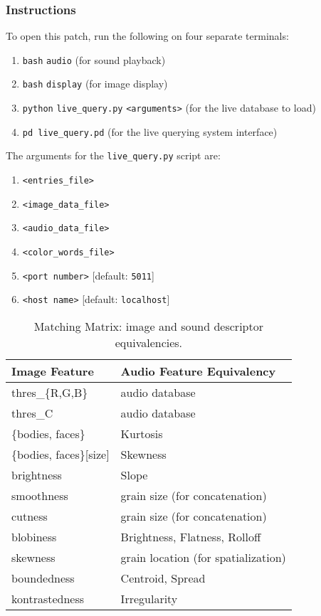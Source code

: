 \subsubsection{Instructions}

To open this patch, run the following on four separate terminals:

\begin{enumerate}
\footnotesize
\singlespacing
\item \texttt{bash} \texttt{audio} (for sound playback)
\item \texttt{bash} \texttt{display} (for image display)
\item \texttt{python} \texttt{live\_query.py} \texttt{<arguments>} (for the live database to load)
\item \texttt{pd live\_query.pd} (for the live querying system interface)
\end{enumerate}

The arguments for the \texttt{live\_query.py} script are:

\begin{enumerate}
  \footnotesize
\singlespacing
  \item \texttt{<entries\_file>} 
  \item \texttt{<image\_data\_file>} 
  \item \texttt{<audio\_data\_file>} 
  \item \texttt{<color\_words\_file>} 
  \item \texttt{<port number>} [default: \texttt{5011}]
  \item \texttt{<host name>} [default: \texttt{localhost}]
\end{enumerate}


\begin{table}
\begin{tabular}{l | l}
Image Feature & Audio Feature Equivalency \tabularnewline\hline

thres\_\{R,G,B\} & audio database \tabularnewline\hline

thres\_C & audio database\tabularnewline\hline

\{bodies, faces\} & Kurtosis\tabularnewline\hline

\{bodies, faces\}{[}size{]} & Skewness\tabularnewline\hline

brightness & Slope\tabularnewline\hline

smoothness & grain size (for concatenation)\tabularnewline\hline


cutness & grain size (for concatenation)\tabularnewline\hline

blobiness & Brightness, Flatness, Rolloff\tabularnewline\hline

skewness & grain location (for spatialization)\tabularnewline\hline

boundedness & Centroid, Spread\tabularnewline\hline

kontrastedness & Irregularity\tabularnewline\hline
\end{tabular}
\label{tab:matching}
\caption{Matching Matrix: image and sound descriptor equivalencies.}
\end{table}








